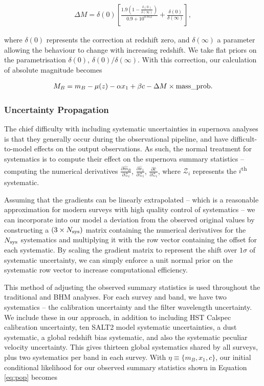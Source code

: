 \documentclass[a4paper,fleqn,usenatbib]{mnras}
\newcommand{\Z}{\mathcal{Z}}
\begin{document}
\begin{align}
\Delta M = \delta(0) \left[ \frac{1.9\left(1 - \frac{\delta(0)}{\delta(\infty)}\right)  }{0.9 + 10^{0.95z}} + \frac{\delta(0)}{\delta(\infty)}\right], \label{eq:mass}
\end{align}

where $\delta(0)$ represents the correction at redshift zero, and $\delta(\infty)$ a parameter allowing the behaviour to change with increasing redshift. We take flat priors on the parametrisation $\delta(0)$, $\delta(0)/\delta(\infty)$. With this correction, our calculation of absolute magnitude becomes

\begin{align}
M_B = m_B - \mu(z) - \alpha x_1 + \beta c - \Delta M \times {\rm mass\_prob}. \label{eq:l2}
\end{align}



\subsubsection{Uncertainty Propagation}
\label{sec:systreat}
The chief difficulty with including systematic uncertainties in supernova analyses is that they generally occur during the observational pipeline, and have difficult-to-model effects on the output observations. As such, the normal treatment for systematics is to compute their effect on the supernova summary statistics -- computing the numerical derivatives $\frac{\partial \hat{m}_B}{\partial \Z_i}$, $\frac{\partial \hat{x}_1}{\partial \Z_i}$, $\frac{\partial \hat{c}}{\partial \Z_i}$, where $\Z_i$ represents the $i$\textsuperscript{th} systematic.

Assuming that the gradients can be linearly extrapolated -- which is a reasonable approximation for modern surveys with high quality control of systematics -- we can incorporate into our model a deviation from the observed original values by constructing a $(3 \times N_{\rm sys})$ matrix containing the numerical derivatives for the $N_{\rm sys}$ systematics and multiplying it with the row vector containing the offset for each systematic. By scaling the gradient matrix to represent the shift over $1\sigma$ of systematic uncertainty, we can simply enforce a unit normal prior on the systematic row vector to increase computational efficiency.

This method of adjusting the observed summary statistics is used throughout the traditional and BHM analyses. For each survey and band, we have two systematics --  the calibration uncertainty and the filter wavelength uncertainty. We include these in our approach, in addition to including HST Calspec calibration uncertainty, ten SALT2 model systematic uncertainties, a dust systematic, a global redshift bias systematic, and also the systematic peculiar velocity uncertainty. This gives thirteen global systematics shared by all surveys, plus two systematics per band in each survey. With $\eta \equiv \lbrace m_B, x_1, c \rbrace$, our initial conditional likelihood for our observed summary statistics shown in Equation \eqref{eq:pop} becomes
\end{document}
